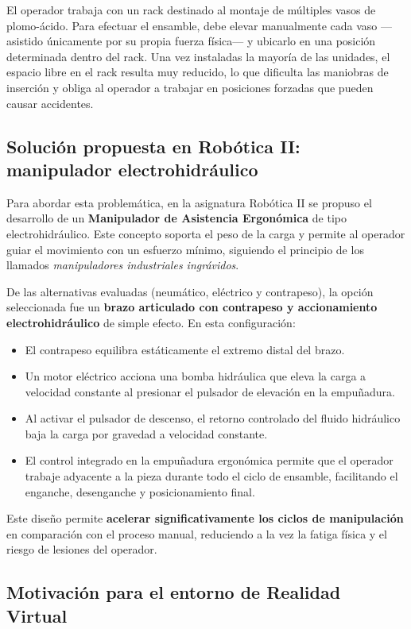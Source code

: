 El operador trabaja con un rack destinado al montaje de múltiples vasos de plomo-ácido. Para efectuar el ensamble, debe elevar manualmente cada vaso ---asistido únicamente por su propia fuerza física--- y ubicarlo en una posición determinada dentro del rack. Una vez instaladas la mayoría de las unidades, el espacio libre en el rack resulta muy reducido, lo que dificulta las maniobras de inserción y obliga al operador a trabajar en posiciones forzadas que pueden causar accidentes.

\subsection{Solución propuesta en Robótica II: manipulador electrohidráulico}

Para abordar esta problemática, en la asignatura Robótica II se propuso el desarrollo de un \textbf{Manipulador de Asistencia Ergonómica} de tipo electrohidráulico. Este concepto soporta el peso de la carga y permite al operador guiar el movimiento con un esfuerzo mínimo, siguiendo el principio de los llamados \textit{manipuladores industriales ingrávidos}.

De las alternativas evaluadas (neumático, eléctrico y contrapeso), la opción seleccionada fue un \textbf{brazo articulado con contrapeso y accionamiento electrohidráulico} de simple efecto. En esta configuración:

\begin{itemize}
    \item El contrapeso equilibra estáticamente el extremo distal del brazo.
    \item Un motor eléctrico acciona una bomba hidráulica que eleva la carga a velocidad constante al presionar el pulsador de elevación en la empuñadura.
    \item Al activar el pulsador de descenso, el retorno controlado del fluido hidráulico baja la carga por gravedad a velocidad constante.
    \item El control integrado en la empuñadura ergonómica permite que el operador trabaje adyacente a la pieza durante todo el ciclo de ensamble, facilitando el enganche, desenganche y posicionamiento final.
\end{itemize}

Este diseño permite \textbf{acelerar significativamente los ciclos de manipulación} en comparación con el proceso manual, reduciendo a la vez la fatiga física y el riesgo de lesiones del operador.

\subsection{Motivación para el entorno de Realidad Virtual}


